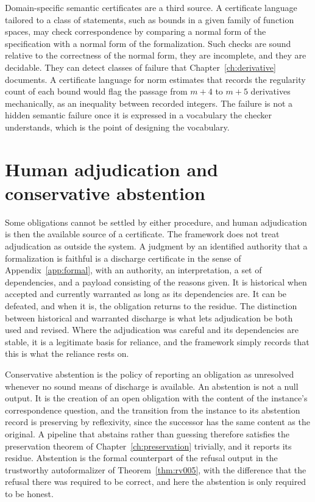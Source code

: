 Domain-specific semantic certificates are a third source. A certificate language tailored to a class of statements, such as bounds in a given family of function spaces, may check correspondence by comparing a normal form of the specification with a normal form of the formalization. Such checks are sound relative to the correctness of the normal form, they are incomplete, and they are decidable. They can detect classes of failure that Chapter~\ref{ch:derivative} documents. A certificate language for norm estimates that records the regularity count of each bound would flag the passage from $m+4$ to $m+5$ derivatives mechanically, as an inequality between recorded integers. The failure is not a hidden semantic failure once it is expressed in a vocabulary the checker understands, which is the point of designing the vocabulary.

\section{Human adjudication and conservative abstention}

Some obligations cannot be settled by either procedure, and human adjudication is then the available source of a certificate. The framework does not treat adjudication as outside the system. A judgment by an identified authority that a formalization is faithful is a discharge certificate in the sense of Appendix~\ref{app:formal}, with an authority, an interpretation, a set of dependencies, and a payload consisting of the reasons given. It is historical when accepted and currently warranted as long as its dependencies are. It can be defeated, and when it is, the obligation returns to the residue. The distinction between historical and warranted discharge is what lets adjudication be both used and revised. Where the adjudication was careful and its dependencies are stable, it is a legitimate basis for reliance, and the framework simply records that this is what the reliance rests on.

Conservative abstention is the policy of reporting an obligation as unresolved whenever no sound means of discharge is available. An abstention is not a null output. It is the creation of an open obligation with the content of the instance's correspondence question, and the transition from the instance to its abstention record is preserving by reflexivity, since the successor has the same content as the original. A pipeline that abstains rather than guessing therefore satisfies the preservation theorem of Chapter~\ref{ch:preservation} trivially, and it reports its residue. Abstention is the formal counterpart of the refusal output in the trustworthy autoformalizer of Theorem~\ref{thm:rv005}, with the difference that the refusal there was required to be correct, and here the abstention is only required to be honest.

